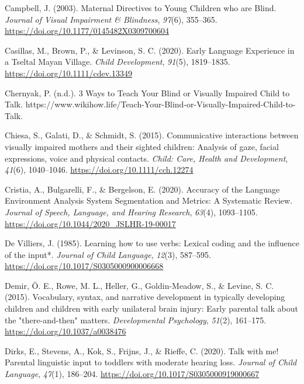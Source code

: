 \documentclass[
  man]{apa6}
\newlength{\cslhangindent}
\newlength{\cslentryspacingunit} %
\newenvironment{CSLReferences}[2] %
 {%
  \setlength{\parindent}{0pt}
  \ifodd #1
  \let\oldpar\par
  \def\par{\hangindent=\cslhangindent\oldpar}
  \fi
  \setlength{\parskip}{#2\cslentryspacingunit}
 }%
 {}
\begin{document}
\begin{CSLReferences}{1}{0}
\leavevmode{}%
Campbell, J. (2003). Maternal {Directives} to {Young Children} who are {Blind}. \emph{Journal of Visual Impairment \& Blindness}, \emph{97}(6), 355--365. \url{https://doi.org/10.1177/0145482X0309700604}

\leavevmode{}%
Casillas, M., Brown, P., \& Levinson, S. C. (2020). Early {Language Experience} in a {Tseltal Mayan Village}. \emph{Child Development}, \emph{91}(5), 1819--1835. \url{https://doi.org/10.1111/cdev.13349}

\leavevmode{}%
Chernyak, P. (n.d.). 3 {Ways} to {Teach Your Blind} or {Visually Impaired Child} to {Talk}. https://www.wikihow.life/Teach-Your-Blind-or-Visually-Impaired-Child-to-Talk.

\leavevmode{}%
Chiesa, S., Galati, D., \& Schmidt, S. (2015). Communicative interactions between visually impaired mothers and their sighted children: Analysis of gaze, facial expressions, voice and physical contacts. \emph{Child: Care, Health and Development}, \emph{41}(6), 1040--1046. \url{https://doi.org/10.1111/cch.12274}

\leavevmode{}%
Cristia, A., Bulgarelli, F., \& Bergelson, E. (2020). Accuracy of the {Language Environment Analysis System Segmentation} and {Metrics}: {A Systematic Review}. \emph{Journal of Speech, Language, and Hearing Research}, \emph{63}(4), 1093--1105. \url{https://doi.org/10.1044/2020_JSLHR-19-00017}

\leavevmode{}%
De Villiers, J. (1985). Learning how to use verbs: Lexical coding and the influence of the input*. \emph{Journal of Child Language}, \emph{12}(3), 587--595. \url{https://doi.org/10.1017/S0305000900006668}

\leavevmode{}%
Demir, Ö. E., Rowe, M. L., Heller, G., Goldin-Meadow, S., \& Levine, S. C. (2015). Vocabulary, syntax, and narrative development in typically developing children and children with early unilateral brain injury: Early parental talk about the "there-and-then" matters. \emph{Developmental Psychology}, \emph{51}(2), 161--175. \url{https://doi.org/10.1037/a0038476}

\leavevmode{}%
Dirks, E., Stevens, A., Kok, S., Frijns, J., \& Rieffe, C. (2020). Talk with me! {Parental} linguistic input to toddlers with moderate hearing loss. \emph{Journal of Child Language}, \emph{47}(1), 186--204. \url{https://doi.org/10.1017/S0305000919000667}


\end{CSLReferences}
\end{document}
